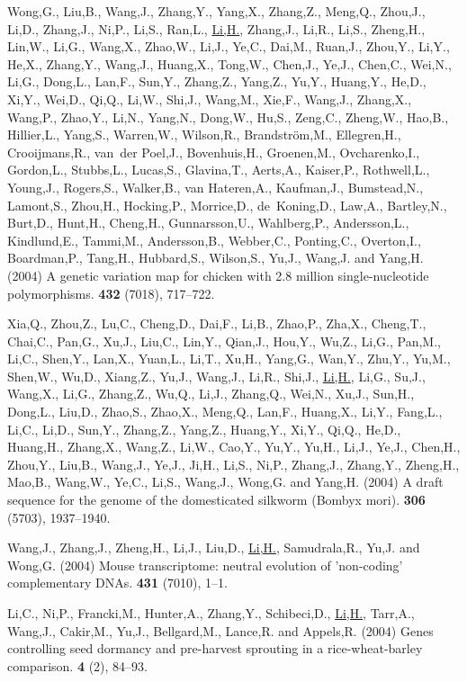 {%
Wong,G., Liu,B., Wang,J., Zhang,Y., Yang,X., Zhang,Z., Meng,Q., Zhou,J., Li,D.,
  Zhang,J., Ni,P., Li,S., Ran,L., \underline{Li,H.}, Zhang,J., Li,R., Li,S., Zheng,H.,
  Lin,W., Li,G., Wang,X., Zhao,W., Li,J., Ye,C., Dai,M., Ruan,J., Zhou,Y.,
  Li,Y., He,X., Zhang,Y., Wang,J., Huang,X., Tong,W., Chen,J., Ye,J., Chen,C.,
  Wei,N., Li,G., Dong,L., Lan,F., Sun,Y., Zhang,Z., Yang,Z., Yu,Y., Huang,Y.,
  He,D., Xi,Y., Wei,D., Qi,Q., Li,W., Shi,J., Wang,M., Xie,F., Wang,J.,
  Zhang,X., Wang,P., Zhao,Y., Li,N., Yang,N., Dong,W., Hu,S., Zeng,C.,
  Zheng,W., Hao,B., Hillier,L., Yang,S., Warren,W., Wilson,R.,
  Brandstr{\"o}m,M., Ellegren,H., Crooijmans,R., van~der Poel,J., Bovenhuis,H.,
  Groenen,M., Ovcharenko,I., Gordon,L., Stubbs,L., Lucas,S., Glavina,T.,
  Aerts,A., Kaiser,P., Rothwell,L., Young,J., Rogers,S., Walker,B., van
  Hateren,A., Kaufman,J., Bumstead,N., Lamont,S., Zhou,H., Hocking,P.,
  Morrice,D., de~Koning,D., Law,A., Bartley,N., Burt,D., Hunt,H., Cheng,H.,
  Gunnarsson,U., Wahlberg,P., Andersson,L., Kindlund,E., Tammi,M.,
  Andersson,B., Webber,C., Ponting,C., Overton,I., Boardman,P., Tang,H.,
  Hubbard,S., Wilson,S., Yu,J., Wang,J.  and Yang,H. (2004{\em{}}) {A genetic
  variation map for chicken with 2.8 million single-nucleotide polymorphisms}.
 {\bf 432} (7018), 717--722.

Xia,Q., Zhou,Z., Lu,C., Cheng,D., Dai,F., Li,B., Zhao,P., Zha,X., Cheng,T.,
  Chai,C., Pan,G., Xu,J., Liu,C., Lin,Y., Qian,J., Hou,Y., Wu,Z., Li,G.,
  Pan,M., Li,C., Shen,Y., Lan,X., Yuan,L., Li,T., Xu,H., Yang,G., Wan,Y.,
  Zhu,Y., Yu,M., Shen,W., Wu,D., Xiang,Z., Yu,J., Wang,J., Li,R., Shi,J.,
  \underline{Li,H.}, Li,G., Su,J., Wang,X., Li,G., Zhang,Z., Wu,Q., Li,J., Zhang,Q.,
  Wei,N., Xu,J., Sun,H., Dong,L., Liu,D., Zhao,S., Zhao,X., Meng,Q., Lan,F.,
  Huang,X., Li,Y., Fang,L., Li,C., Li,D., Sun,Y., Zhang,Z., Yang,Z., Huang,Y.,
  Xi,Y., Qi,Q., He,D., Huang,H., Zhang,X., Wang,Z., Li,W., Cao,Y., Yu,Y.,
  Yu,H., Li,J., Ye,J., Chen,H., Zhou,Y., Liu,B., Wang,J., Ye,J., Ji,H., Li,S.,
  Ni,P., Zhang,J., Zhang,Y., Zheng,H., Mao,B., Wang,W., Ye,C., Li,S., Wang,J.,
  Wong,G.  and Yang,H. (2004{\em{}}) {A draft sequence for the genome of the
  domesticated silkworm (Bombyx mori)}.
 {\bf 306} (5703), 1937--1940.

Wang,J., Zhang,J., Zheng,H., Li,J., Liu,D., \underline{Li,H.}, Samudrala,R., Yu,J.  and
  Wong,G. (2004{\em{}}) {Mouse transcriptome: neutral evolution of 'non-coding'
  complementary DNAs}.
 {\bf 431} (7010), 1--1.

Li,C., Ni,P., Francki,M., Hunter,A., Zhang,Y., Schibeci,D., \underline{Li,H.}, Tarr,A.,
  Wang,J., Cakir,M., Yu,J., Bellgard,M., Lance,R.  and Appels,R. (2004{\em{}})
  {Genes controlling seed dormancy and pre-harvest sprouting in a
  rice-wheat-barley comparison}.
 {\bf 4} (2), 84--93.

}

